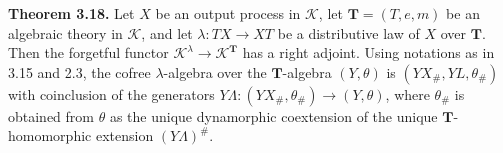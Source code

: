 \textbf{Theorem 3.18.} Let $X$ be an output process in $\mathcal{K}$, let $\mathbf{T} = (T, e, m)$ be an algebraic theory in $\mathcal{K}$, and let $\lambda: TX \longrightarrow XT$ be a distributive law of $X$ over $\mathbf{T}$. Then the forgetful functor $\mathcal{K}^{\lambda} \longrightarrow \mathcal{K}^{\mathbf{T}}$ has a right adjoint. Using notations as in 3.15 and 2.3, the cofree $\lambda$-algebra over the $\mathbf{T}$-algebra $(Y, \theta)$ is $(YX_{\#}, YL, \theta_{\#})$ with coinclusion of the generators $Y\Lambda: (YX_{\#}, \theta_{\#}) \longrightarrow (Y, \theta)$, where $\theta_{\#}$ is obtained from $\theta$ as the unique dynamorphic coextension of the unique $\mathbf{T}$-homomorphic extension $(Y\Lambda)^{\#}$.
